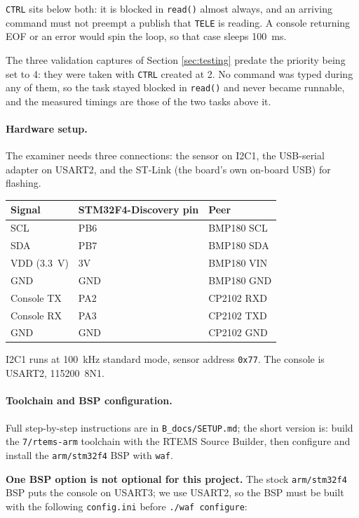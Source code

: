 \documentclass[10pt,a4]{article}
\begin{document}
\texttt{CTRL} sits below both: it is blocked in \texttt{read()} almost always,
and an arriving command must not preempt a publish that \texttt{TELE} is reading.
A console returning EOF or an error would spin the loop, so that case sleeps
100~ms.

The three validation captures of Section \ref{sec:testing} predate the priority
being set to 4: they were taken with \texttt{CTRL} created at 2. No command was
typed during any of them, so the task stayed blocked in \texttt{read()} and never
became runnable, and the measured timings are those of the two tasks above it.

\paragraph{Hardware setup.} The examiner needs three connections: the sensor on
I2C1, the USB-serial adapter on USART2, and the ST-Link (the board's own on-board
USB) for flashing.

\begin{center}
\begin{tabular}{lll}
Signal & STM32F4-Discovery pin & Peer \\
\hline
SCL & PB6 & BMP180 SCL \\
SDA & PB7 & BMP180 SDA \\
VDD (3.3~V) & 3V & BMP180 VIN \\
GND & GND & BMP180 GND \\
Console TX & PA2 & CP2102 RXD \\
Console RX & PA3 & CP2102 TXD \\
GND & GND & CP2102 GND \\
\end{tabular}
\end{center}

I2C1 runs at 100~kHz standard mode, sensor address \texttt{0x77}. The console is
USART2, 115200~8N1.

\paragraph{Toolchain and BSP configuration.} Full step-by-step instructions are
in \texttt{B\_docs/SETUP.md}; the short version is: build the
\texttt{7/rtems-arm} toolchain with the RTEMS Source Builder, then configure and
install the \texttt{arm/stm32f4} BSP with \texttt{waf}.

\textbf{One BSP option is not optional for this project.} The stock
\texttt{arm/stm32f4} BSP puts the console on USART3; we use USART2, so the BSP
must be built with the following \texttt{config.ini} before
\texttt{./waf configure}:
\end{document}
